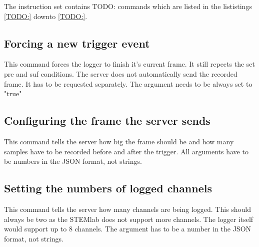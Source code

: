 The  instruction  set  contains  TODO:   commands  which  are  listed  in  the
lististings \ref{TODO:} downto \ref{TODO:}.

\subsection{Forcing a new trigger event}

This command forces the logger to  finish it's current frame. It still repects
the set pre and suf conditions.
The  server does  not  automatically send  the recorded  frame. It  has to  be
requested separately.
The argument needs to be always set to "true"


\subsection{Configuring the frame the server sends}

This command tells the server how big the frame should be and how many samples
have to  be recorded before  and after the  trigger. All arguments have  to be
numbers in the JSON format, not strings.


\subsection{Setting the numbers of logged channels}

This command tells the server how  many channels are being logged. This should
always be two as the STEMlab does not support more channels. The logger itself
would support up to 8 channels.
The argument has to be a number in the JSON format, not strings.

